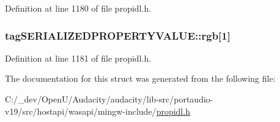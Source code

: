 Definition at line 1180 of file propidl.\+h.

\subsubsection[{\texorpdfstring{rgb}{rgb}}]{ tag\+S\+E\+R\+I\+A\+L\+I\+Z\+E\+D\+P\+R\+O\+P\+E\+R\+T\+Y\+V\+A\+L\+U\+E\+::rgb\mbox{[}1\mbox{]}}\hypertarget{structtag_s_e_r_i_a_l_i_z_e_d_p_r_o_p_e_r_t_y_v_a_l_u_e_a0a9e8a6ad2197ca05f086a0013d6e0b6}{}\label{structtag_s_e_r_i_a_l_i_z_e_d_p_r_o_p_e_r_t_y_v_a_l_u_e_a0a9e8a6ad2197ca05f086a0013d6e0b6}


Definition at line 1181 of file propidl.\+h.



The documentation for this struct was generated from the following file\+:\begin{DoxyCompactItemize}
\item 
C\+:/\+\_\+dev/\+Open\+U/\+Audacity/audacity/lib-\/src/portaudio-\/v19/src/hostapi/wasapi/mingw-\/include/\hyperlink{propidl_8h}{propidl.\+h}\end{DoxyCompactItemize}
